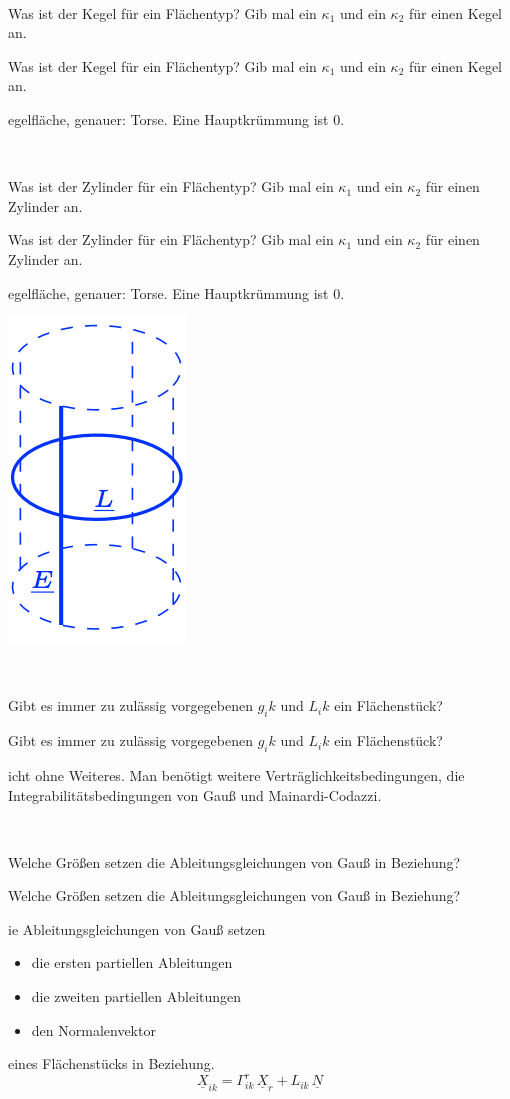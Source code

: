 \documentclass[DIV=1]{scrartcl}
\newcommand{\frage}[3][10]{
    \newpage
    \
    \vspace{#1 em}
    \begin{framed}
        #2
    \end{framed}
    \newpage
    \begin{framed}
        #2
    \end{framed}
    \vspace{2 em}
}
\begin{document}
\frage{Was ist der Kegel für ein Flächentyp? Gib mal ein $\kappa_1$ und ein $\kappa_2$ für einen Kegel an.}

Regelfläche, genauer: Torse. Eine Hauptkrümmung ist $0$.



\frage{Was ist der Zylinder für ein Flächentyp? Gib mal ein $\kappa_1$ und ein $\kappa_2$ für einen Zylinder an.}

Regelfläche, genauer: Torse. Eine Hauptkrümmung ist $0$.
\\
\begin{center}
    \includegraphics[scale=1]{zylinder.png}
\end{center}














\frage{Gibt es immer zu zulässig vorgegebenen $g_ik$ und $L_ik$ ein Flächenstück?}

Nicht ohne Weiteres. Man benötigt weitere Verträglichkeitsbedingungen, die Integrabilitätsbedingungen von Gauß und Mainardi-Codazzi.



\frage{Welche Größen setzen die Ableitungsgleichungen von Gauß in Beziehung?}

Die Ableitungsgleichungen von Gauß setzen
\begin{itemize}
    \item die ersten partiellen Ableitungen
    \item die zweiten partiellen Ableitungen
    \item den Normalenvektor
\end{itemize}
eines Flächenstücks in Beziehung.
\[
    \underline{X}_{ik} = \Gamma_{ik}^r \, \underline{X}_r + L_{ik} \, \underline{N}
\]
\end{document}
